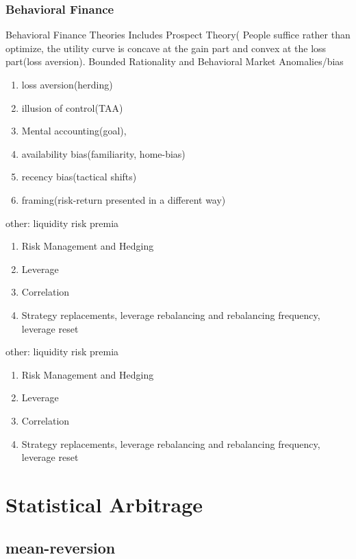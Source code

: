 \documentclass[11pt, openany]{book}              %
\begin{document}
\subsection{Behavioral Finance}

Behavioral Finance Theories Includes Prospect Theory( People suffice rather than optimize, the utility curve is concave at the gain part and convex at the loss part(loss aversion). Bounded Rationality and 
Behavioral Market Anomalies/bias

\begin{enumerate}
 \item loss aversion(herding)
 \item illusion of control(TAA) 
 \item Mental accounting(goal),
 \item availability bias(familiarity, home-bias)
 \item recency bias(tactical shifts)
 \item framing(risk-return presented in a different way)
\end{enumerate}


other: liquidity risk premia
\begin{enumerate}
 \item Risk Management and Hedging 
 \item Leverage 
 \item Correlation
 \item Strategy replacements, leverage rebalancing and rebalancing frequency, leverage reset
\end{enumerate}


other: liquidity risk premia
\begin{enumerate}
 \item Risk Management and Hedging 
 \item Leverage 
 \item Correlation
 \item Strategy replacements, leverage rebalancing and rebalancing frequency, leverage reset
\end{enumerate}

\chapter{Statistical Arbitrage}

\section{mean-reversion}
\end{document}
